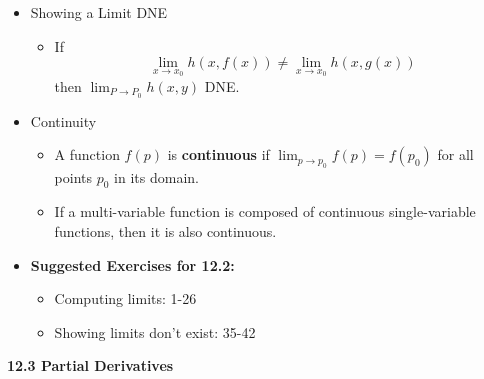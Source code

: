 \documentclass[12pt]{article}
\newcommand{\ds}{\displaystyle}
\newcommand{\<}{\left<}
\renewcommand{\>}{\right>}
\begin{document}
\begin{itemize}
    \item Showing a Limit DNE
    
      \begin{itemize}
        \item If
          \[
            \lim_{x\to x_0} h(x,f(x)) \not= \lim_{x\to x_0} h(x,g(x))
          \]
          then $\ds\lim_{P\to P_0} h(x,y)$ DNE.
      \end{itemize}
    
    \item Continuity
    
      \begin{itemize}
        \item A function $f(p)$ is \textbf{continuous} if $\ds \lim_{p\to p_0}f(p) = f(p_0)$ for all points $p_0$ in its domain.
        \item If a multi-variable function is composed of continuous single-variable functions, then it is also continuous.
      \end{itemize}
    
    \item \textbf{ Suggested Exercises for 12.2:}
    
      \begin{itemize}
      \item Computing limits: 1-26
      \item Showing limits don't exist: 35-42
      \end{itemize}
  
  \end{itemize}
  
  \newpage
  
  \centerline{\bf 12.3 Partial Derivatives}
  
\end{document}
